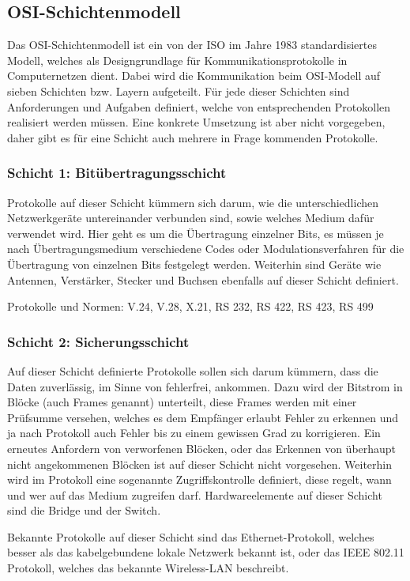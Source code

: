 \documentclass[a4paper,14pt,headsepline]{scrartcl}
\begin{document}
\subsection{OSI-Schichtenmodell}
Das OSI-Schichtenmodell ist ein von der ISO im Jahre 1983 standardisiertes Modell, welches als Designgrundlage für Kommunikationsprotokolle in Computernetzen dient. Dabei wird die Kommunikation beim OSI-Modell auf sieben Schichten bzw. Layern aufgeteilt. Für jede dieser Schichten sind Anforderungen und Aufgaben definiert, welche von entsprechenden Protokollen realisiert werden müssen. Eine konkrete Umsetzung ist aber nicht vorgegeben, daher gibt es für eine Schicht auch mehrere in Frage kommenden Protokolle.

\subsubsection*{Schicht 1: Bitübertragungsschicht}
Protokolle auf dieser Schicht kümmern sich darum, wie die unterschiedlichen Netzwerkgeräte untereinander verbunden sind, sowie welches Medium dafür verwendet wird. Hier geht es um die Übertragung einzelner Bits, es müssen je nach Übertragungsmedium verschiedene Codes oder Modulationsverfahren für die Übertragung von einzelnen Bits festgelegt werden. Weiterhin sind Geräte wie Antennen, Verstärker, Stecker und Buchsen ebenfalls auf dieser Schicht definiert.

Protokolle und Normen: V.24, V.28, X.21, RS 232, RS 422, RS 423, RS 499

\newpage

\subsubsection*{Schicht 2: Sicherungsschicht}
Auf dieser Schicht definierte Protokolle sollen sich darum kümmern, dass die Daten zuverlässig, im Sinne von fehlerfrei, ankommen. Dazu wird der Bitstrom in Blöcke (auch Frames genannt) unterteilt, diese Frames werden mit einer Prüfsumme versehen, welches es dem Empfänger erlaubt Fehler zu erkennen und ja nach Protokoll auch Fehler bis zu einem gewissen Grad zu korrigieren. Ein erneutes Anfordern von verworfenen Blöcken, oder das Erkennen von überhaupt nicht angekommenen Blöcken ist auf dieser Schicht nicht vorgesehen. Weiterhin wird im Protokoll eine sogenannte Zugriffskontrolle definiert, diese regelt, wann und wer auf das Medium zugreifen darf. Hardwareelemente auf dieser Schicht sind die Bridge und der Switch.

Bekannte Protokolle auf dieser Schicht sind das Ethernet-Protokoll, welches besser als das kabelgebundene lokale Netzwerk bekannt ist, oder das IEEE 802.11 Protokoll, welches das bekannte Wireless-LAN beschreibt.
\end{document}
